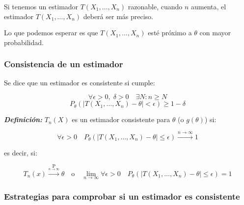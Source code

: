 \documentclass{article}
\begin{document}
Si tenemos un estimador \( T(X_1, \dots, X_n) \) razonable, cuando \( n \) aumenta, el estimador \( T(X_1, \dots, X_n) \) deberá ser más preciso.

\setlength{\parskip}{0em}   %
Lo que podemos esperar es que \( T(X_1, \dots, X_n) \) esté próximo a \( \theta \) con mayor probabilidad.

\subsubsection{Consistencia de un estimador}

Se dice que un estimador es consistente si cumple:
\setlength{\parskip}{1em}

\[\forall \epsilon > 0, \; \delta > 0 \quad \exists N: n \geq N\]
\[P_\theta\left(|T(X_1, \dots, X_n) - \theta| < \epsilon\right) \geq 1 - \delta\]

\textbf{\textit{Definición: }} \(T_n(X)\) es un estimador consistente para \(\theta\) (o \(g(\theta)\)) si:

\[
    \forall \epsilon > 0 \quad P_\theta\left(|T(X_1, \dots, X_n) - \theta| \leq \epsilon\right) \xrightarrow{n \to \infty} 1
\]

es decir, si:

\[
    T_n(x) \xrightarrow{\underset{n \to \infty}{\text{P}}} \theta \quad \text{o} \quad \lim_{n \to \infty} \forall \epsilon > 0 \quad P_\theta\left(|T(X_1, \dots, X_n) - \theta| \leq \epsilon\right) = 1
\]

\newpage
\subsubsection*{Estrategias para comprobar si un estimador es consistente}
\end{document}
